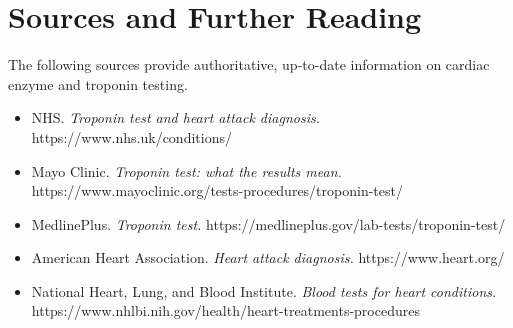 \section*{Sources and Further Reading}
The following sources provide authoritative, up-to-date information on cardiac enzyme and troponin testing.
\begin{itemize}
    \item NHS. \textit{Troponin test and heart attack diagnosis.} https://www.nhs.uk/conditions/
    \item Mayo Clinic. \textit{Troponin test: what the results mean.} https://www.mayoclinic.org/tests-procedures/troponin-test/
    \item MedlinePlus. \textit{Troponin test.} https://medlineplus.gov/lab-tests/troponin-test/
    \item American Heart Association. \textit{Heart attack diagnosis.} https://www.heart.org/
    \item National Heart, Lung, and Blood Institute. \textit{Blood tests for heart conditions.} https://www.nhlbi.nih.gov/health/heart-treatments-procedures
\end{itemize}

